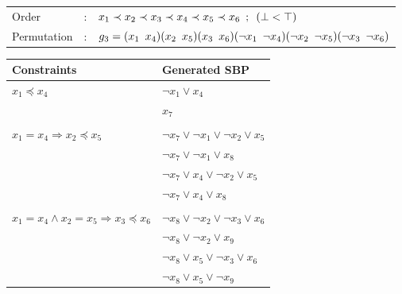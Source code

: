 


\begin{center}
	\begin{tabular}{lll}
		Order &:& $ x_1 \prec x_2 \prec x_3 \prec x_4 \prec x_5 \prec x_6 \enskip ; \enskip  (\bot < \top)$ \\
		Permutation &:& $g_3 = (x_1 \enskip x_4)(x_2 \enskip x_5)(x_3 \enskip x_6)(\neg x_1 \enskip \neg x_4)(\neg x_2 \enskip \neg x_5)(\neg x_3 \enskip \neg x_6)$
	\end{tabular}
	
	\vspace*{2\baselineskip}
	
	\begin{tabular}{ll}
		Constraints & Generated SBP\\
		\midrule
		$x_1 \preceq x_4$ & $ \neg x_1 \lor x_4$ \\
		& $x_7$ \\
		&\\
		$x_1 = x_4 \Rightarrow x_2 \preceq x_5$ &  $ \neg x_7 \lor \neg x_1 \lor \neg x_2 \lor x_5$\\
		& $ \neg x_7 \lor \neg x_1 \lor x_8$\\
		& $ \neg x_7 \lor  x_4 \lor \neg x_2 \lor x_5$ \\
		& $ \neg x_7 \lor x_4 \lor x_8$\\
		
		&\\
		$x_1 = x_4 \land x_2 = x_5 \Rightarrow x_3 \preceq x_6$ 
		& $\neg x_8 \lor \neg x_2 \lor \neg x_3 \lor x_6$\\
		& $\neg x_8 \lor \neg x_2 \lor x_9$\\
		& $\neg x_8 \lor x_5 \lor \neg x_3 \lor x_6$\\
		& $\neg x_8 \lor x_5 \lor \neg x_9$\\

	\end{tabular}
\end{center}